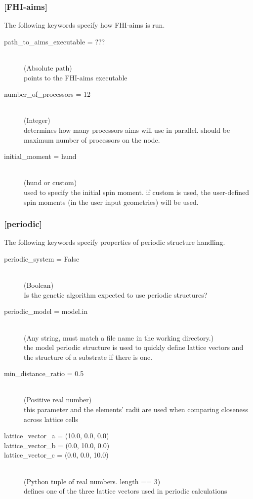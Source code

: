 \subsubsection{[FHI-aims]}
		The following keywords specify how FHI-aims is run.
\begin{description}
		\item[path\_to\_aims\_executable = ???]~\\
			(Absolute path)\\
			points to the FHI-aims executable
		\item[number\_of\_processors = 12]~\\
			(Integer)\\
			determines how many processors aims will use in parallel. should be maximum number of processors on the node.
		\item[initial\_moment = hund]~\\
			(hund or custom)\\
			used to specify the initial spin moment. if custom is used, the user-defined spin moments (in the user input geometries) will be used.
\end{description}

\subsubsection{	[periodic]}
		The following keywords specify properties of periodic structure handling.
\begin{description}
		\item[periodic\_system = False]~\\
			(Boolean)\\
			Is the genetic algorithm expected to use periodic structures?
		\item[periodic\_model = model.in]~\\
			(Any string, must match a file name in the working directory.)\\
			the model periodic structure is used to quickly define lattice vectors and the structure of a substrate if there is one.
		\item[min\_distance\_ratio = 0.5]~\\
			(Positive real number)\\
			this parameter and the elements' radii are used when comparing closeness across lattice cells
		\item[lattice\_vector\_a = (10.0, 0.0, 0.0)]
		\item[lattice\_vector\_b = (0.0, 10.0, 0.0)]
		\item[lattice\_vector\_c = (0.0, 0.0, 10.0)]~\\
		(Python tuple of real numbers. length == 3)\\
		defines one of the three lattice vectors used in periodic calculations
\end{description}

